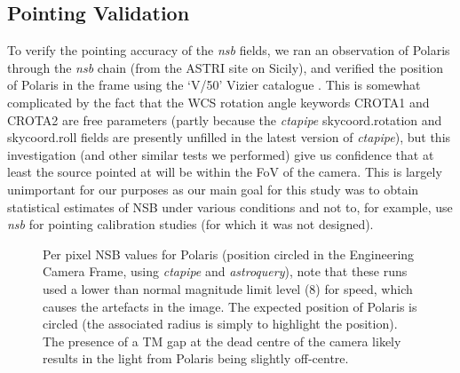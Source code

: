 \subsection{Pointing Validation}
To verify the pointing accuracy of the \textit{nsb} fields, we ran an observation of Polaris through the \textit{nsb} chain (from the ASTRI site on Sicily), and verified the position of Polaris in the frame using the `V/50' Vizier catalogue \cite{vizier}. This is somewhat complicated by the fact that the WCS rotation angle keywords CROTA1 and CROTA2 are free parameters (partly because the \textit{ctapipe} skycoord.rotation and skycoord.roll fields are presently unfilled in the latest version of \textit{ctapipe}), but this investigation (and other similar tests we performed) give us confidence that at least the source pointed at will be within the FoV of the camera. This is largely unimportant for our purposes as our main goal for this study was to obtain statistical estimates of NSB under various conditions and not to, for example, use \textit{nsb} for pointing calibration studies (for which it was not designed).
\begin{figure}[ht!]
\begin{centering}
\caption{Per pixel NSB values for Polaris (position circled in the Engineering Camera Frame, using \textit{ctapipe} and \textit{astroquery}), note that these runs used a lower than normal magnitude limit level (8) for speed, which causes the artefacts in the image. The expected position of Polaris is circled (the associated radius is simply to highlight the position). The presence of a TM gap at the dead centre of the camera likely results in the light from Polaris being slightly off-centre.}
\label{fig:polaris}
\end{centering}
\end{figure} 

